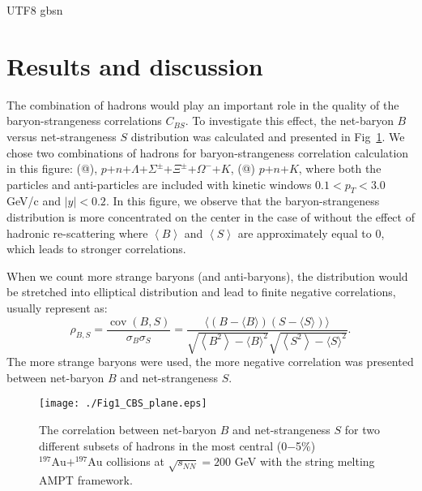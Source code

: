 \documentclass[twocolumn,showpacs,preprintnumbers,amsmath,amssymb]{revtex4-1}
\makeatletter
\newcommand{\Rmnum}[1]{\expandafter\@slowromancap\romannumeral #1@}
\makeatother
\begin{document}
\begin{CJK*} {UTF8} {gbsn}
	\section{Results and discussion}
	\label{sec:result}
		
		The combination of hadrons would play an important role in the quality of the baryon-strangeness correlations $C_{BS}$. To investigate this effect, the net-baryon $B$ versus net-strangeness $S$ distribution was calculated and presented in Fig~\ref{Fig1_BS_plane}.
		We chose two combinations of hadrons for baryon-strangeness correlation calculation in this figure:
		(\Rmnum{1}), $p$+$n$+$\Lambda$+$\Sigma^{\pm}$+$\Xi^{\pm}$+$\Omega^{-}$+$K$, (\Rmnum{2}) $p$+$n$+$K$, 
	where both the particles and anti-particles are included
	with kinetic windows $0.1<p_{T}<3.0$ GeV/c and $|y|<0.2$.
	In this figure, we {} observe that the baryon-strangeness distribution is more concentrated on the center in the case of without the effect of hadronic re-scattering where $\left\langle B \right\rangle$ and $\left\langle S \right\rangle$ are approximately equal to 0, which leads to stronger correlations.
	
	When we {} count more strange baryons (and anti-baryons), the distribution would be stretched into elliptical distribution and lead to finite negative correlations, usually 
	represent as:
	\begin{equation}
\rho_{B, S}=\frac{\operatorname{cov}(B, S)}{\sigma_{B} \sigma_{S}}=\frac{\langle(B-\langle B\rangle)(S-\langle S\rangle)\rangle}{\sqrt{\left\langle B^{2}\right\rangle-\langle B\rangle^{2}} \sqrt{\left\langle S^{2}\right\rangle-\langle S\rangle^{2}}}.
\end{equation}
The more strange baryons were used, the more negative correlation was presented between net-baryon $B$ and net-strangeness $S$.
	
		\begin{figure}[htb]
				\texttt{[image: ./Fig1\_CBS\_plane.eps]}
				\caption{The correlation between net-baryon $B$ and net-strangeness $S$ for two different subsets of hadrons in the most central (0$-$5\%) $\mathrm{^{197}Au+^{197}Au}$ collisions at $\sqrt{s_{NN}} = 200$ GeV with the string melting AMPT framework.}
				\label{Fig1_BS_plane}
	\end{figure}


\end{CJK*}
\end{document}

